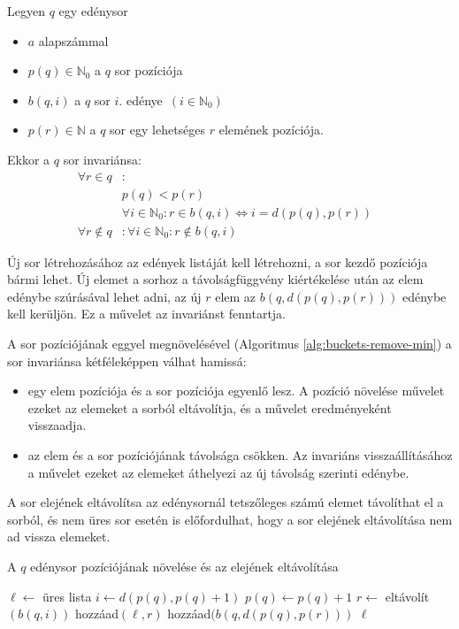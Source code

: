 Legyen $q$ egy edénysor
\begin{itemize}
\item $a$ alapszámmal
\item $p(q) \in \mathbb{N}_0$ a $q$ sor pozíciója
\item $b(q, i)$ a $q$ sor $i$. edénye\ $(i \in \mathbb{N}_0)$
\item $p(r) \in \mathbb{N}$ a $q$ sor egy lehetséges $r$ elemének pozíciója.
\end{itemize}
Ekkor a $q$ sor invariánsa:
\begin{align*}
\forall r \in q &: &\\ 
	& p(q) < p(r) \\
	& \forall i \in \mathbb{N}_0: r \in b(q, i) \iff i=d(p(q), p(r)) \\
\forall r \not\in q &: \forall i \in \mathbb{N}_0: r \not\in b(q, i)
\end{align*}

Új sor létrehozásához az edények listáját kell létrehozni, a sor kezdő pozíciója bármi lehet.
Új elemet a sorhoz a távolságfüggvény kiértékelése után az elem edénybe szúrásával lehet adni, az új $r$ elem az $b(q, d(p(q), p(r)))$ edénybe kell kerüljön.
Ez a művelet az invariánst fenntartja.

A sor pozíciójának eggyel megnövelésével (Algoritmus \ref{alg:buckets-remove-min}) a sor invariánsa kétféleképpen válhat hamissá:
\begin{itemize}
\item egy elem pozíciója és a sor pozíciója egyenlő lesz. A pozíció növelése művelet ezeket az elemeket a sorból eltávolítja, és a művelet eredményeként visszaadja.
\item az elem és a sor pozíciójának távolsága csökken. Az invariáns visszaállításához a művelet ezeket az elemeket áthelyezi az új távolság szerinti edénybe.
\end{itemize}
A sor elejének eltávolítsa az edénysornál tetszőleges számú elemet távolíthat el a sorból, és nem üres sor esetén is előfordulhat, hogy a sor elejének eltávolítása nem ad vissza elemeket.

\begin{algorithm}[H]
\caption{A $q$ edénysor pozíciójának növelése és az elejének eltávolítása}
\label{alg:buckets-remove-min}
\begin{algorithmic}[1]
	\State $\ell \gets$ üres lista
	\State $i \gets d(p(q), p(q)+1)$
	\State $p(q) \gets p(q)+1$
		\State $r \gets$ eltávolít$(b(q, i))$
			\State hozzáad$(\ell, r)$
		\Else
			\State hozzáad$(b(q, d(p(q), p(r)))$
		\EndIf
	\EndWhile
	\State \Return $\ell$
\EndFunction
\end{algorithmic}
\end{algorithm}

